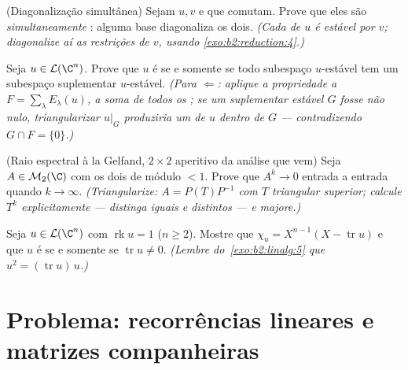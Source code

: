 \begin{exercise}[$\star\star\star$]\label{exo:b2:reduction:9}
(Diagonalização simultânea) Sejam $u, v$  e
que comutam. Prove que eles são \emph{simultaneamente}
: alguma base diagonaliza os dois. \emph{(Cada 
de $u$ é estável por $v$; diagonalize aí as restrições de $v$,
usando \cref{exo:b2:reduction:4}.)}
\end{exercise}

\begin{exercise}[$\star\star\star$]\label{exo:b2:reduction:10}
Seja $u \in \mathcal{L}(\C^n)$. Prove que $u$ é  se
e somente se todo subespaço $u$-estável tem um subespaço suplementar
$u$-estável. \emph{(Para $\Leftarrow$: aplique a propriedade
a $F = \sum_\lambda E_\lambda(u)$, a soma de todos os ; se um
suplementar estável $G$ fosse não nulo, triangularizar $u|_G$ produziria
um  de $u$ dentro de $G$ --- contradizendo $G \cap
F = \{0\}$.)}
\end{exercise}

\begin{exercise}[$\star\star\star$]\label{exo:b2:reduction:11}
(Raio espectral à la Gelfand, $2\times2$ aperitivo da análise que
vem) Seja $A \in \mathcal{M}_2(\C)$ com os dois  de
módulo $< 1$. Prove que $A^k \to 0$ entrada a entrada quando $k \to \infty$.
\emph{(Triangularize: $A = P(T)P^{-1}$ com $T$ triangular superior;
calcule $T^k$ explicitamente --- distinga  iguais e
distintos --- e majore.)}
\end{exercise}

\begin{exercise}[$\star\star$]\label{exo:b2:reduction:12}
Seja $u \in \mathcal{L}(\C^n)$ com $\operatorname{rk} u = 1$ ($n
\geq 2$). Mostre que $\chi_u = X^{n-1}(X - \operatorname{tr} u)$
e que $u$ é  se e somente se $\operatorname{tr} u
\neq 0$. \emph{(Lembre do~\cref{exo:b2:linalg:5} que $u^2 =
(\operatorname{tr} u)\,u$.)}
\end{exercise}

\section{Problema: recorrências lineares e matrizes companheiras}

